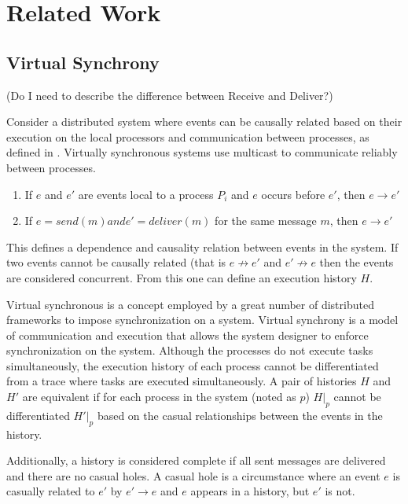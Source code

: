 \chapter{Related Work}

\section{Virtual Synchrony}

(Do I need to describe the difference between Receive and Deliver?)

Consider a distributed system where events can be causally related based
on their execution on the local processors and communication between
processes, as defined in \cite[p~.101]{ISISTOOLKIT}. Virtually synchronous systems use multicast
to communicate reliably between processes.

\begin{enumerate}
    \item If $e$ and $e'$ are events local to a process $P_{i}$ and $e$ occurs before $e'$, then $e \rightarrow e'$
    \item If $e = send(m) and e'=deliver(m)$ for the same message $m$, then $e \rightarrow e'$
\end{enumerate} \cite[p~.101]{ISISTOOLKIT}

This defines a dependence and causality relation between events in the system.
If two events cannot be causally related (that is $e \not\rightarrow e'$ and
$e' \not\rightarrow e$ then the events are considered concurrent. From this
one can define an execution history $H$.

Virtual synchronous is a concept employed by a great number of distributed
frameworks to impose synchronization on a system. Virtual synchrony is a
model of communication and execution that allows the system designer to
enforce synchronization on the system. Although the processes do not
execute tasks simultaneously, the execution history of each process cannot
be differentiated from a trace where tasks are executed simultaneously. A
pair of histories $H$ and $H'$ are equivalent if for each process in the
system (noted as $p$) $H|_{p}$ cannot be differentiated $H'|_{p}$ based
on the casual relationships between the events in the history. \cite[p~.103]{ISISTOOLKIT}

Additionally, a history is considered complete if all sent messages are
delivered and there are no casual holes. A casual hole is a circumstance
where an event $e$ is casually related to $e'$ by $e' \rightarrow e$ and
$e$ appears in a history, but $e'$ is not. 


